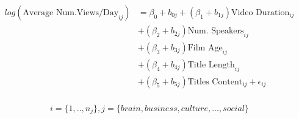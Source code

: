 \begin{align}
\begin{split}
log(\text{Average Num.Views/Day}_{ij})&=\beta_0+b_{0j}+(\beta_1+b_{1j})\text{Video Duration}_{ij}\\
&+(\beta_2+b_{2j})\text{Num. Speakers}_{ij}\\
&+(\beta_3+b_{3j})\text{Film Age}_{ij}\\
&+(\beta_4+b_{4j})\text{Title Length}_{ij}\\
&+(\beta_5+b_{5j})\text{Titles Content}_{ij}+\epsilon_{ij}\\
\end{split}
\label{poisson_mixed_themes_eqn}
\end{align}

\begin{equation*}
i=\{1,..,n_j\}, j=\{brain, business, culture,..., social\}
\end{equation*}